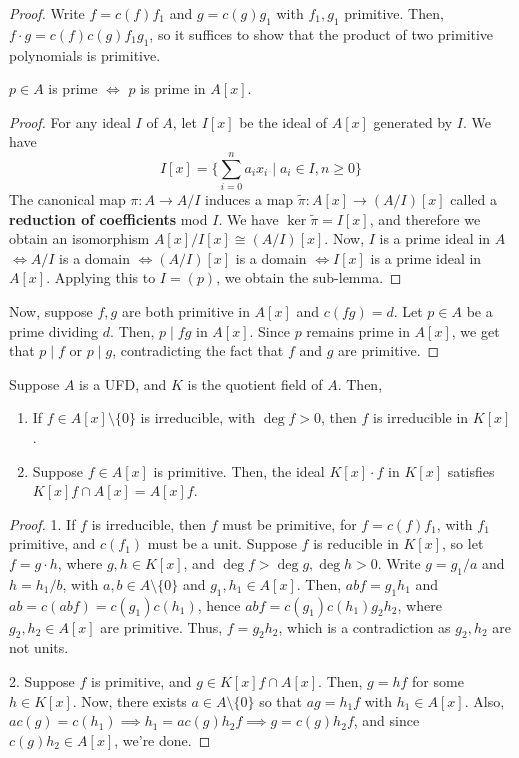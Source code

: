 \begin{proof}
    Write $f=c(f)f_1$ and $g=c(g)g_1$ with $f_1,g_1$ primitive. Then, $f\cdot g=c(f)c(g)f_1g_1$, so it suffices to show that the product of two primitive polynomials is primitive.
    \begin{notebox*}
        $p \in A$ is prime $\iff$ $p$ is prime in $A[x]$.
    \end{notebox*}
    \begin{proof}
        For any ideal $I$ of $A$, let $I[x]$ be the ideal of $A[x]$ generated by $I$. We have
        $$I[x] = \{ \sum _{i=0}^na_ix_i \mid a_i \in I,n\geq 0\}$$
        The canonical map $\pi: A \to A/I$ induces a map $\tilde \pi : A[x] \to (A/I)[x]$ called a \textbf{reduction of coefficients} mod $I$. We have $\ker \tilde \pi = I[x]$, and therefore we obtain an isomorphism $A[x]/I[x] \cong (A/I)[x]$. Now, $I$ is a prime ideal in $A$ $\iff A/I$ is a domain $\iff (A/I)[x]$ is a domain $\iff I[x]$ is a prime ideal in $A[x]$. Applying this to $I=(p)$, we obtain the sub-lemma.
    \end{proof}
    Now, suppose $f,g$ are both primitive in $A[x]$ and $c(fg)=d$. Let $p\in A$ be a prime dividing $d$. Then, $p \mid fg$ in $A[x]$. Since $p$ remains prime in $A[x]$, we get that $p \mid f$ or $p \mid g$, contradicting the fact that $f$ and $g$ are primitive.
\end{proof}

\begin{cor}
    Suppose $A$ is a UFD, and $K$ is the quotient field of $A$. Then,
    \begin{enumerate}
        \item If $f\in A[x]\setminus \{0\}$ is irreducible, with $\deg f >0$, then $f$ is irreducible in $K[x]$.
        \item Suppose $f\in A[x]$ is primitive. Then, the ideal $K[x]\cdot f$ in $K[x]$ satisfies $K[x]f \cap A[x] = A[x]f$.
    \end{enumerate}
\end{cor}

\begin{proof}
    \hfill

    1. If $f$ is irreducible, then $f$ must be primitive, for $f = c(f) f_1$, with $f_1$ primitive, and $c(f_1)$ must be a unit. Suppose $f$ is reducible in $K[x]$, so let $f=g\cdot h$, where $g,h\in K[x]$, and $\deg f > \deg g,\deg h>0$. Write $g = g_1/a$ and $h=h_1/b$, with $a,b \in A\setminus \{0\}$ and $g_1,h_1 \in A[x]$. Then, $abf=g_1h_1$ and $ab=c(abf)=c(g_1)c(h_1)$, hence $abf=c(g_1)c(h_1)g_2h_2$, where $g_2,h_2 \in A[x]$ are primitive. Thus, $f=g_2h_2$, which is a contradiction as $g_2,h_2$ are not units.

    2. Suppose $f$ is primitive, and $g \in K[x]f \cap A[x]$. Then, $g=hf$ for some $h \in K[x]$. Now, there exists $a \in A \setminus \{0\}$ so that $ag=h_1f$ with $h_1 \in A[x]$. Also, $ac(g)=c(h_1)\implies h_1=ac(g)h_2f \implies g= c(g)h_2f$, and since $c(g)h_2 \in A[x]$, we're done.
\end{proof}

